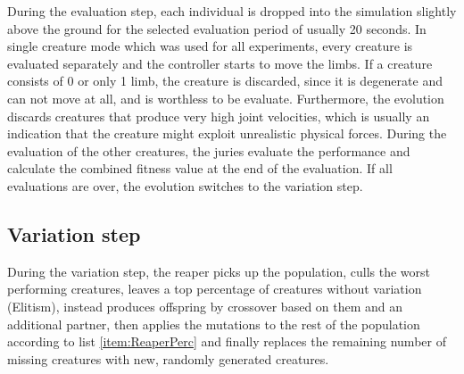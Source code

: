 \documentclass[main]{subfiles}
\begin{document}
During the evaluation step, each individual is dropped into the simulation slightly above the ground for the selected evaluation period of usually 20 seconds. In single creature mode which was used for all experiments, every creature is evaluated separately and the controller starts to move the limbs. If a creature consists of 0 or only 1 limb, the creature is discarded, since it is degenerate and can not move at all, and is worthless to be evaluate. Furthermore, the evolution discards creatures that produce very high joint velocities, which is usually an indication that the creature might exploit unrealistic physical forces. During the evaluation of the other creatures, the juries evaluate the performance and calculate the combined fitness value at the end of the evaluation. If all evaluations are over, the evolution switches to the variation step.

\subsection{Variation step}

During the variation step, the reaper picks up the population, culls the worst performing creatures, leaves a top percentage of creatures without variation (Elitism), instead produces offspring by crossover based on them and an additional partner, then applies the mutations to the rest of the population according to list \ref{item:ReaperPerc} and finally replaces the remaining number of missing creatures with new, randomly generated creatures.
\end{document}
